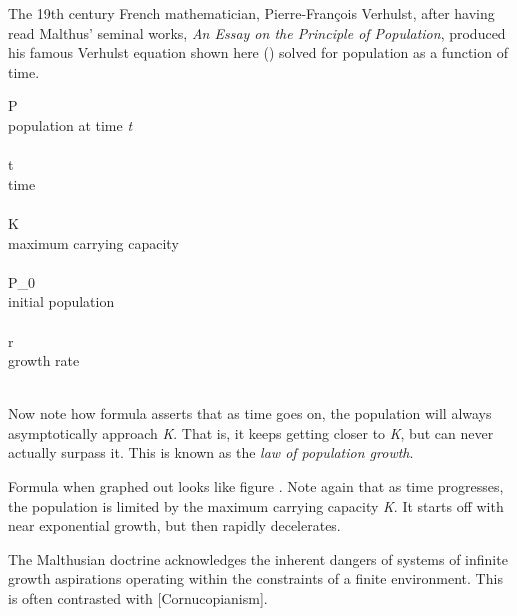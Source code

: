 The 19th century French mathematician, Pierre-François Verhulst, after having read Malthus' seminal works, {\it An Essay on the Principle of Population}, produced his famous Verhulst equation shown here () solved for population as a function of time.
\crlf

\startformula
{}
\stopformula
\startlegend
\leg P \\ population at time {\it t} \\ \\
\leg t \\ time \\ \\
\leg K \\ maximum carrying capacity \\ \\
\leg P_0 \\ initial population \\ \\
\leg r \\ growth rate \\ \\
\stoplegend
\crlf

Now note how formula  asserts that as time goes on, the population will always asymptotically approach {\it K}. That is, it keeps getting closer to {\it K}, but can never actually surpass it. This is known as the {\it law of population growth}.
\crlf

\startformula
{}
\stopformula
\crlf

Formula  when graphed out looks like figure . Note again that as time progresses, the population is limited by the maximum carrying capacity {\it K}. It starts off with near exponential growth, but then rapidly decelerates.

    {}

The Malthusian doctrine acknowledges the inherent dangers of systems of infinite growth aspirations operating within the constraints of a finite environment. This is often contrasted with [Cornucopianism].

